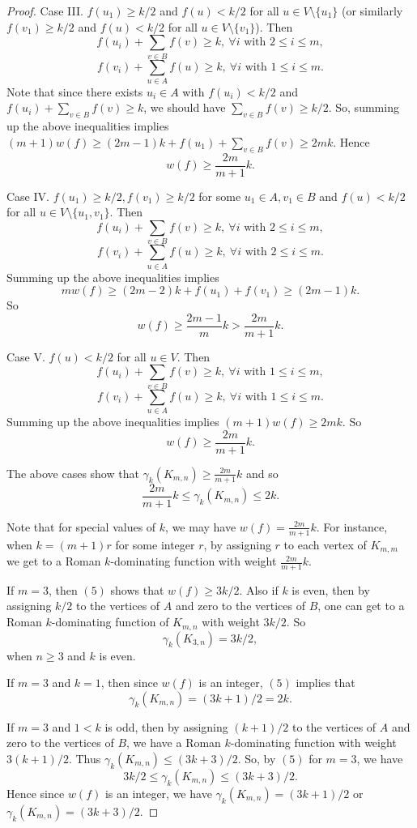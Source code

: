 \documentclass[12pt]{amsart}
\begin{document}
\begin{proof}
Case III. $f(u_1)\geq k/2$ and $f(u)<k/2$ for all $u\in V\setminus \{u_1\}$ (or similarly $f(v_1)\geq k/2$ and $f(u)<k/2$ for all $u\in V\setminus \{v_1\}$). Then 
$$f(u_i)+\sum_{v\in B}f(v)\geq k, \ \forall i \textrm{ with }   2\leq i \leq m,$$
$$f(v_i)+\sum_{u\in A}f(u)\geq k, \ \forall i \textrm{ with }  1\leq i \leq m.$$ 
Note that since there exists $u_i\in A$ with $f(u_i)<k/2$ and $f(u_i)+\sum_{v\in B}f(v)\geq k$, we should have $\sum_{v\in B}f(v)\geq k/2$. So, summing up the above inequalities implies $(m+1)w(f)\geq (2m-1)k+f(u_1)+\sum_{v\in B}f(v)\geq 2mk$. Hence
$$w(f)\geq \frac{2m}{m+1}k.$$

Case IV. $f(u_1)\geq k/2, f(v_1)\geq k/2$ for some $u_1\in A, v_1\in B$ and $f(u)<k/2$ for all $u\in V\setminus \{u_1, v_1\}$. Then
$$f(u_i)+\sum_{v\in B}f(v)\geq k, \ \forall i \textrm{ with }  2\leq i \leq m,$$
$$f(v_i)+\sum_{u\in A}f(u)\geq k, \ \forall i \textrm{ with }  2\leq i \leq m.$$
Summing up the above inequalities implies 
$$mw(f)\geq (2m-2)k+f(u_1)+f(v_1)\geq (2m-1)k.$$
So
$$w(f)\geq \frac{2m-1}{m}k> \frac{2m}{m+1}k.$$

Case V. $f(u)<k/2$ for all $u\in V$. Then 
$$f(u_i)+\sum_{v\in B}f(v)\geq k, \ \forall i \textrm{ with }  1\leq i \leq m,$$
$$f(v_i)+\sum_{u\in A}f(u)\geq k, \ \forall i \textrm{ with }  1\leq i \leq m.$$
Summing up the above inequalities implies $(m+1)w(f)\geq 2mk$. So
$$w(f)\geq \frac{2m}{m+1}k.$$

The above cases show that $\gamma_k(K_{m,n})\geq \frac{2m}{m+1}k$ and so 
\begin{equation}
\frac{2m}{m+1}k \leq \gamma_k(K_{m,n})\leq 2k.
\end{equation}

Note that for special values of $k$, we may have $w(f)=\frac{2m}{m+1}k$. For instance, when $k=(m+1)r$ for some integer $r$, by assigning $r$ to each vertex of $K_{m,m}$ we get to a Roman $k$-dominating function with weight $\frac{2m}{m+1}k$.

If $m=3$, then $(5)$ shows that $w(f)\geq 3k/2$. Also if $k$ is even, then by assigning $k/2$ to the vertices of $A$ and zero to the vertices of $B$, one can get to a  Roman $k$-dominating function of $K_{m,n}$ with weight $3k/2$. So 
$$\gamma_k(K_{3,n})=3k/2,$$
when $n\geq 3$ and $k$ is even.

If $m=3$ and $k=1$, then since $w(f)$ is an integer, $(5)$ implies that 
$$\gamma_k(K_{m,n})=(3k+1)/2=2k.$$

If $m=3$ and $1<k$ is odd, then by assigning $(k+1)/2$ to the vertices of $A$ and zero to the vertices of $B$, we have a Roman $k$-dominating function with weight $3(k+1)/2$. Thus $\gamma_k(K_{m,n}) \leq (3k+3)/2 $. So, by $(5)$  for $m=3$, we have 
$$3k/2 \leq \gamma_k(K_{m,n})\leq (3k+3)/2.$$
 Hence since $w(f)$ is an integer, we have $\gamma_k(K_{m,n})=(3k+1)/2$ or $\gamma_k(K_{m,n})=(3k+3)/2$. 


\end{proof}
\end{document}
